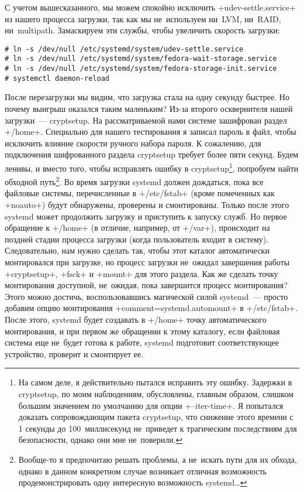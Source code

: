 \documentclass[10pt,oneside,a4paper]{article}
\begin{document}
С учетом вышесказанного, мы можем спокойно исключить +udev-settle.service+ из
нашего процесса загрузки, так как мы не~используем ни~LVM, ни~RAID,
ни~multipath. Замаскируем эти службы, чтобы увеличить скорость загрузки:
\begin{Verbatim}
# ln -s /dev/null /etc/systemd/system/udev-settle.service
# ln -s /dev/null /etc/systemd/system/fedora-wait-storage.service
# ln -s /dev/null /etc/systemd/system/fedora-storage-init.service
# systemctl daemon-reload
\end{Verbatim}

После перезагрузки мы видим, что загрузка стала на одну секунду быстрее. Но
почему выигрыш оказался таким маленьким? Из-за второго осквернителя нашей
загрузки~--- cryptsetup. На рассматриваемой нами системе зашифрован раздел
+/home+. Специально для нашего тестирования я записал пароль в файл, чтобы
исключить влияние скорости ручного набора пароля. К сожалению, для подключения
шифрованного раздела cryptsetup требует более пяти секунд. Будем ленивы, и
вместо того, чтобы исправлять ошибку в cryptsetup\footnote{На самом деле, я
действительно пытался исправить эту ошибку. Задержки в cryptsetup, по
моим наблюдениям, обусловлены, главным образом, слишком большим значением по
умолчанию для опции +--iter-time+. Я попытался доказать сопровождающим пакета
cryptsetup, что снижение этого времени с 1 секунды до 100~миллисекунд
не~приведет к трагическим последствиям для безопасности, однако они мне
не~поверили.}, попробуем найти обходной путь\footnote{Вообще-то я предпочитаю
решать проблемы, а не~искать пути для их обхода, однако в данном конкретном
случае возникает отличная возможность продемонстрировать одну интересную
возможность systemd\ldots{}}. Во время загрузки systemd должен дождаться, пока
все файловые системы, перечисленные в +/etc/fstab+ (кроме помеченных как
+noauto+) будут обнаружены, проверены и смонтированы. Только после этого systemd
может продолжить загрузку и приступить к запуску служб. Но первое обращение
к +/home+ (в отличие, например, от +/var+), происходит на поздней стадии
процесса загрузки (когда пользователь входит в систему). Следовательно, нам
нужно сделать так, чтобы этот каталог автоматически монтировался при загрузке,
но процесс загрузки не~ожидал завершения работы +cryptsetup+, +fsck+ и +mount+
для этого раздела. Как же сделать точку монтирования доступной, не~ожидая, пока
завершится процесс монтирования? Этого можно достичь, воспользовавшись
магической силой systemd~--- просто добавим опцию монтирования
+comment=systemd.automount+ в +/etc/fstab+. После этого, systemd будет создавать
в +/home+ точку автоматического монтирования, и при первом же обращении к этому
каталогу, если файловая система еще не~будет готова к работе, systemd подготовит
соответствующее устройство, проверит и смонтирует ее.
\end{document}
